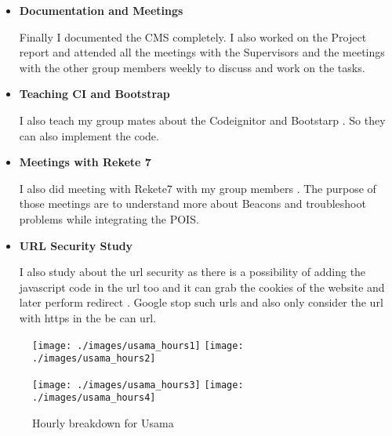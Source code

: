 \begin{itemize}
	\item \textbf{Documentation and Meetings}
	\par Finally I documented the CMS completely. I also worked on the Project report and attended all the meetings with the Supervisors and the meetings with the other group members weekly to discuss and work on the tasks.
	\item \textbf{Teaching CI and Bootstrap}
	\par I also teach my group mates about the Codeignitor and Bootstarp . So they can also implement the code.
	\item \textbf{Meetings with Rekete 7}
	\par I also did meeting with Rekete7 with my group members . The purpose of those meetings are to understand more about Beacons and troubleshoot problems while integrating the POIS.
	\item \textbf{URL Security Study}
	\par I also study about the url security as there is a possibility of adding the javascript code in the url too and it can grab the cookies of the website and later perform redirect . Google stop such urls and also only consider the url with https in the be can url.
\end{itemize}

\begin{figure}[H]
	\centering
	\texttt{[image: ./images/usama\_hours1]}
	\texttt{[image: ./images/usama\_hours2]}
\end{figure}
\begin{figure}[H]
	\centering
	\texttt{[image: ./images/usama\_hours3]}
	\texttt{[image: ./images/usama\_hours4]}
	\caption{Hourly breakdown for Usama}
\end{figure}
